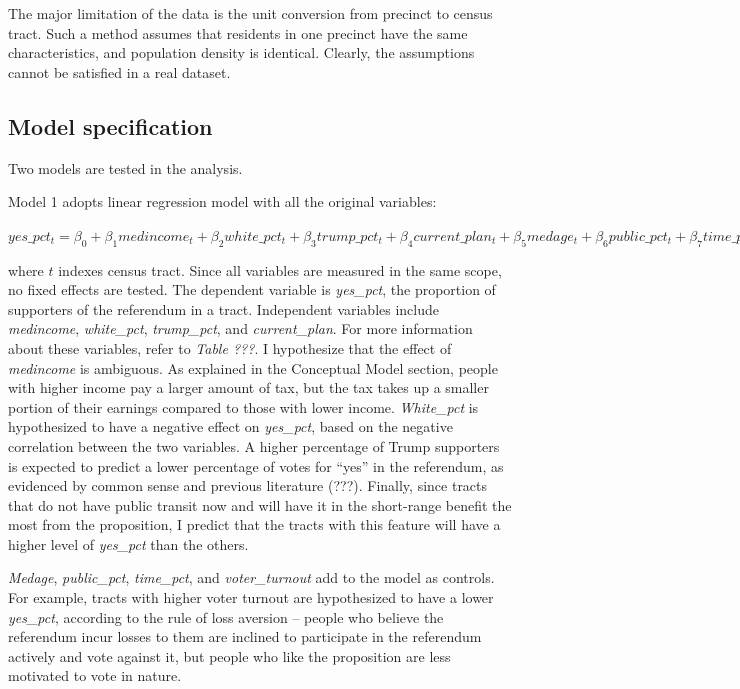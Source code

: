 \documentclass[
]{article}
\begin{document}
The major limitation of the data is the unit conversion from precinct to
census tract. Such a method assumes that residents in one precinct have
the same characteristics, and population density is identical. Clearly,
the assumptions cannot be satisfied in a real dataset.

\hypertarget{model-specification}{%
\subsection{Model specification}\label{model-specification}}

Two models are tested in the analysis.

Model 1 adopts linear regression model with all the original variables:

\(yes\_pct_t = \beta_0+\beta_1medincome_t+\beta_2white\_pct_t+\beta_3trump\_pct_t+\beta_4current\_plan_t+\beta_5medage_t+\beta_6public\_pct_t+\beta_7time\_pct_t+\beta_8voter\_turnout_t+\epsilon_t\)

where \(t\) indexes census tract. Since all variables are measured in
the same scope, no fixed effects are tested. The dependent variable is
\emph{yes\_pct}, the proportion of supporters of the referendum in a
tract. Independent variables include \emph{medincome},
\emph{white\_pct}, \emph{trump\_pct}, and \emph{current\_plan}. For more
information about these variables, refer to \emph{Table ???}. I
hypothesize that the effect of \emph{medincome} is ambiguous. As
explained in the Conceptual Model section, people with higher income pay
a larger amount of tax, but the tax takes up a smaller portion of their
earnings compared to those with lower income. \emph{White\_pct} is
hypothesized to have a negative effect on \emph{yes\_pct}, based on the
negative correlation between the two variables. A higher percentage of
Trump supporters is expected to predict a lower percentage of votes for
``yes'' in the referendum, as evidenced by common sense and previous
literature (???). Finally, since tracts that do not have public transit
now and will have it in the short-range benefit the most from the
proposition, I predict that the tracts with this feature will have a
higher level of \emph{yes\_pct} than the others.

\emph{Medage}, \emph{public\_pct}, \emph{time\_pct}, and
\emph{voter\_turnout} add to the model as controls. For example, tracts
with higher voter turnout are hypothesized to have a lower
\emph{yes\_pct}, according to the rule of loss aversion -- people who
believe the referendum incur losses to them are inclined to participate
in the referendum actively and vote against it, but people who like the
proposition are less motivated to vote in nature.
\end{document}
